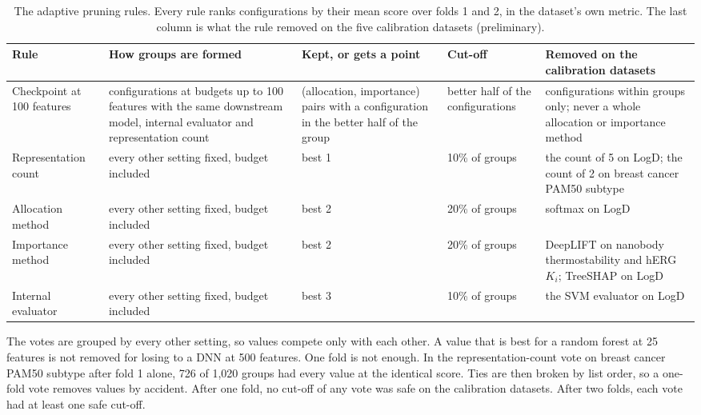 \begin{table}[htbp]
\centering
\small
\caption[The adaptive pruning rules.]{The adaptive pruning rules. Every rule ranks configurations by their mean score over folds 1 and 2, in the dataset's own metric. The last column is what the rule removed on the five calibration datasets (preliminary).}
\label{tab:pruning_rules}
\begin{adjustbox}{max width=\textwidth}
\begin{tabular}{@{}P{2.2cm}P{3.4cm}P{2.8cm}P{1.6cm}P{3.6cm}@{}}
\toprule
Rule & How groups are formed & Kept, or gets a point & Cut-off & Removed on the calibration datasets \\
\midrule
Checkpoint at 100 features & configurations at budgets up to 100 features with the same downstream model, internal evaluator and representation count & (allocation, importance) pairs with a configuration in the better half of the group & better half of the configurations & configurations within groups only; never a whole allocation or importance method \\
\addlinespace
Representation count & every other setting fixed, budget included & best 1 & 10\% of groups & the count of 5 on LogD; the count of 2 on breast cancer PAM50 subtype \\
\addlinespace
Allocation method & every other setting fixed, budget included & best 2 & 20\% of groups & softmax on LogD \\
\addlinespace
Importance method & every other setting fixed, budget included & best 2 & 20\% of groups & DeepLIFT on nanobody thermostability and hERG $K_i$; TreeSHAP on LogD \\
\addlinespace
Internal evaluator & every other setting fixed, budget included & best 3 & 10\% of groups & the SVM evaluator on LogD \\
\bottomrule
\end{tabular}
\end{adjustbox}
\end{table}

The votes are grouped by every other setting, so values compete only with each other. A value that is best for a random forest at 25 features is not removed for losing to a DNN at 500 features. One fold is not enough. In the representation-count vote on breast cancer PAM50 subtype after fold 1 alone, 726 of 1,020 groups had every value at the identical score. Ties are then broken by list order, so a one-fold vote removes values by accident. After one fold, no cut-off of any vote was safe on the calibration datasets. After two folds, each vote had at least one safe cut-off.

